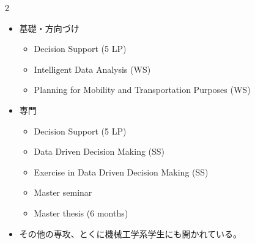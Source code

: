 \begin{multicols}{2}

\footnotesize

\raggedcolumns


\begin{itemize}
\item 基礎・方向づけ
\begin{itemize}
\item Decision Support (5 LP)
\item Intelligent Data Analysis (WS)
\item Planning for Mobility and Transportation Purposes (WS)
\end{itemize}
\item 専門
\begin{itemize}
\item Decision Support (5 LP)
\item Data Driven Decision Making (SS)
\item Exercise in Data Driven Decision Making (SS)
\item Master seminar
\item Master thesis (6 months)
\end{itemize}
\item その他の専攻、とくに機械工学系学生にも開かれている。
\end{itemize}

\end{multicols}

\clearpage



\vspace{1.5mm}

